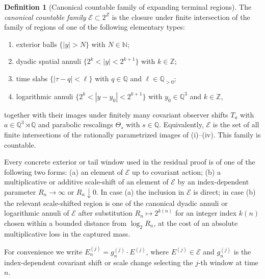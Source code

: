 \documentclass[11pt]{amsart}
\numberwithin{equation}{section}
\theoremstyle{plain}
\theoremstyle{definition}
\newtheorem{definition}[definition]{Definition}
\theoremstyle{remark}
\begin{document}
\begin{definition}[Canonical countable family of expanding terminal regions]
\label{def:canonical-expanding-family}
The \emph{canonical countable family} \(\mathcal E\subset 2^Z\) is the closure
under finite intersection of the family of regions of one of the following
elementary types:
\begin{enumerate}[label=\textup{(\roman*)},leftmargin=2.2em]
   \item exterior balls \(\{|y|>N\}\) with \(N\in\mathbb N\);
   \item dyadic spatial annuli \(\{2^k<|y|<2^{k+1}\}\) with
      \(k\in\mathbb Z\);
   \item time slabs \(\{|\tau-q|<\ell\}\) with \(q\in\mathbb Q\) and
      \(\ell\in\mathbb Q_{>0}\);
   \item logarithmic annuli \(\{2^k<|y-y_0|<2^{k+1}\}\) with
      \(y_0\in\mathbb Q^3\) and \(k\in\mathbb Z\),
\end{enumerate}
together with their images under finitely many covariant observer shifts
\(T_a\) with \(a\in\mathbb Q^3\rtimes\mathbb Q\) and parabolic rescalings
\(\Theta_s\) with \(s\in\mathbb Q\).  Equivalently, \(\mathcal E\) is the set
of all finite intersections of the rationally parametrized images of
\textup{(i)}--\textup{(iv)}.  This family is countable.

Every concrete exterior or tail window used in the residual proof is of one
of the following two forms: \textup{(a)} an element of \(\mathcal E\) up to
covariant action; \textup{(b)} a multiplicative or additive scale-shift of an
element of \(\mathcal E\) by an index-dependent parameter \(R_n\to\infty\) or
\(R_n\downarrow0\).  In case \textup{(a)} the inclusion in \(\mathcal E\) is
direct; in case \textup{(b)} the relevant scale-shifted region is one of the
canonical dyadic annuli or logarithmic annuli of \(\mathcal E\) after
substitution \(R_n\mapsto2^{k(n)}\) for an integer index \(k(n)\) chosen
within a bounded distance from \(\log_2R_n\), at the cost of an absolute
multiplicative loss in the captured mass.

For convenience we write \(E_n^{(j)}=g_n^{(j)}\cdot E^{(j)}\), where
\(E^{(j)}\in\mathcal E\) and \(g_n^{(j)}\) is the index-dependent covariant
shift or scale change selecting the \(j\)-th window at time \(n\).
\end{definition}
\end{document}
